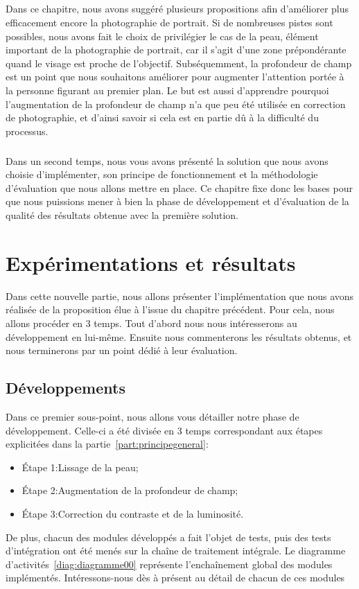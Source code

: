 \documentclass[11pt, french,screen]{report-rd-info}
\begin{document}
\paragraph*{}
Dans ce chapitre, nous avons suggéré plusieurs propositions afin d'améliorer plus efficacement encore la photographie de portrait. Si de nombreuses pistes sont possibles, nous avons fait le choix de privilégier le cas de la peau, élément important de la photographie de portrait, car il s'agit d'une zone prépondérante quand le visage est proche de l'objectif. Subséquemment, la profondeur de champ est un point que nous souhaitons améliorer pour augmenter l'attention portée à la personne figurant au premier plan. Le but est aussi d'apprendre pourquoi l'augmentation de la profondeur de champ n'a que peu été utilisée en correction de photographie, et d'ainsi savoir si cela est en partie dû à la difficulté du processus.

\paragraph*{}
Dans un second temps, nous vous avons présenté la solution que nous avons choisie d'implémenter, son principe de fonctionnement et la méthodologie d'évaluation que nous allons mettre en place.
Ce chapitre fixe donc les bases pour que nous puissions mener à bien la phase de développement et d'évaluation de la qualité des résultats obtenue avec la première solution.


\chapter{Expérimentations et résultats}
\label{chap:Experimentations}
Dans cette nouvelle partie, nous allons présenter l'implémentation que nous avons réalisée de la proposition élue à l'issue du chapitre précédent. Pour cela, nous allons procéder en 3 temps. Tout d'abord nous nous intéresserons au développement en lui-même. Ensuite nous commenterons les résultats obtenus, et nous terminerons par un point dédié à leur évaluation.
\section{Développements}
Dans ce premier sous-point, nous allons vous détailler notre phase de développement. Celle-ci a été divisée en 3 temps correspondant aux étapes explicitées dans la partie~\ref{part:principegeneral}:
\begin{itemize}
\item{Étape 1:}Lissage de la peau;
\item{Étape 2:}Augmentation de la profondeur de champ;
\item{Étape 3:}Correction du contraste et de la luminosité.
\end{itemize}
De plus, chacun des modules développés a fait l'objet de tests, puis des tests d'intégration ont été menés sur la chaîne de traitement intégrale. Le diagramme d'activités~\ref{diag:diagramme00} représente l'enchaînement global des modules implémentés. Intéressons-nous dès à présent au détail de chacun de ces modules
\end{document}
